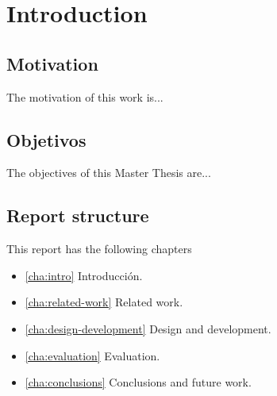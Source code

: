 
\chapter{Introduction}
\label{cha:intro}

\section{Motivation}
The motivation of this work is...

\section{Objetivos}
The objectives of this Master Thesis are...

\section{Report structure}
This report has the following chapters

\begin{itemize}
\item \autoref{cha:intro} Introducción. 
\item \autoref{cha:related-work} Related work. 
\item \autoref{cha:design-development} Design and development. 
\item \autoref{cha:evaluation} Evaluation.
\item \autoref{cha:conclusions} Conclusions and future work.
\end{itemize}

